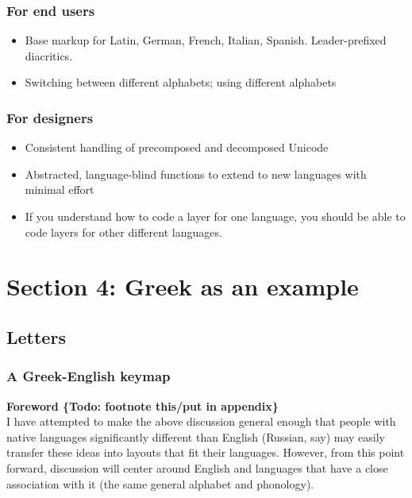 \documentclass[11pt]{article}
\begin{document}
\subsubsection{For end users}
\label{sec:org31fa87b}

\begin{itemize}
\item Base markup for Latin, German, French, Italian, Spanish. Leader-prefixed diacritics.
\item Switching between different alphabets; using different alphabets
\end{itemize}

\subsubsection{For designers}
\label{sec:org7399818}

\begin{itemize}
\item Consistent handling of precomposed and decomposed Unicode
\item Abstracted, language-blind functions to extend to new languages with minimal effort
\item If you understand how to code a layer for one language, you should be able to code layers for other different languages.
\end{itemize}

\section{Section 4: Greek as an example}
\label{sec:org67e82c9}

\subsection{Letters}
\label{sec:orgbcde056}

\subsubsection{A Greek-English keymap}
\label{sec:orgf437890}

\noindent \textbf{Foreword \{Todo: footnote this/put in appendix\}} \\

I have attempted to make the above discussion general enough that people with native languages significantly different than English (Russian, say) may easily transfer these ideas into layouts that fit their languages. However, from this point forward, discussion will center around English and languages that have a close association with it (the same general alphabet and phonology). \\
\end{document}
